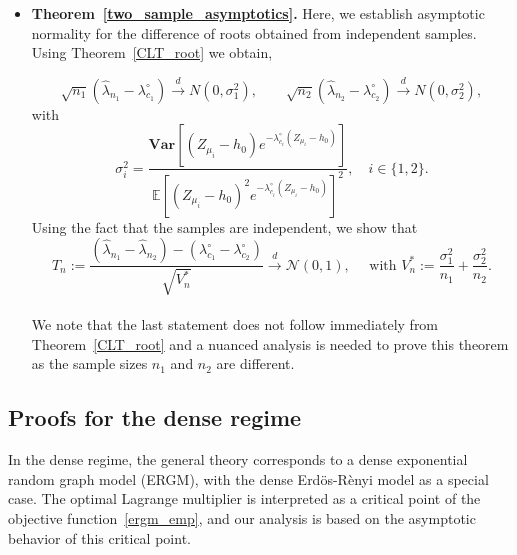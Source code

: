 \documentclass[12pt]{article}
\def\er{ Erd{\"o}s-R{\`e}nyi }
\numberwithin{equation}{section}
\begin{document}
\begin{itemize}
Then the consistency of \(\hat{\lambda}_n\) ensures that
the denominator in the RHS of \eqref{Z_Taylor_short} converges in probability: \[\dot{\Psi}_n(\lambda^{\circ}) + \frac{1}{2} (\hat{\lambda}_n - \lambda^{\circ}) \ddot{\Psi}_n(\tilde{\lambda}_n)\xrightarrow{P}\mathbb{E}\left[-(Z_{\mu}-h_0)^2e^{-\lambda^{\circ}(Z_{\mu}-h_0)}\right].\]
Next using Lemma \ref{CLT_1}, we show that 
\[\sqrt{n} (\Psi_n(\lambda^{\circ}) - \mathbb{E}[\Psi_n(\lambda^{\circ})])\xrightarrow{d}\mathcal{N}\left(0,\mathbf{Var}\left[(Z_{\mu}-h_0)e^{-\lambda(Z_{\mu}-h_0)}\right]\right).\]
Finally using Slutsky's theorem, we get
\[
\sqrt{n}(\hat{\lambda}_n - \lambda^{\circ}) \xrightarrow{d} \mathcal{N}\left(0, \frac{\mathbf{Var}\left[(Z_{\mu}-h_0)e^{-\lambda^{\circ}(Z_{\mu}-h_0)}\right]}{\mathbb{E}\left[(Z_{\mu}-h_0)^2e^{-\lambda^{\circ}(Z_{\mu}-h_0)}\right]^2}\right).
\]\\

    \item \textbf{Theorem~\ref{two_sample_asymptotics}.} Here, we establish asymptotic normality for the difference of roots obtained from independent samples. Using Theorem~\ref{CLT_root} we obtain,
   
\[
\sqrt{n_1}(\hat{\lambda}_{n_1} - \lambda^{\circ}_{c_1}) \xrightarrow{d} N(0, \sigma_1^2), 
\qquad 
\sqrt{n_2}(\hat{\lambda}_{n_2} - \lambda^{\circ}_{c_2}) \xrightarrow{d} N(0, \sigma_2^2),
\]
with $$\sigma^2_i=\frac{\mathbf{Var}\left[(Z_{\mu_i}-h_0)e^{-\lambda_{c_i}^{\circ}(Z_{\mu_i}-h_0)}\right]}{\mathbb{E}\left[(Z_{\mu_i}-h_0)^2e^{-\lambda_{c_i}^{\circ}(Z_{\mu_i}-h_0)}\right]^2}, \quad i\in\{1,2\}.$$
Using the fact that the samples are independent, we show that 
\[
T_n := \frac{(\hat{\lambda}_{n_1} - \hat{\lambda}_{n_2})-(\lambda^{\circ}_{c_1}-\lambda^{\circ}_{c_2})}{\sqrt{V_n^\ast}}\xrightarrow{d}\mathcal{N}(0,1),
\quad \text{ with }
V_n^\ast := \frac{\sigma_1^2}{n_1} + \frac{\sigma_2^2}{n_2}.
\]\\
We note that the last statement does not follow immediately from  Theorem~\ref{CLT_root} and a nuanced analysis is needed to prove this theorem as the sample sizes $n_1$ and $n_2$ are different. 
\end{itemize}

\subsection{Proofs for the dense regime}

In the dense regime, the general theory corresponds to a dense exponential random graph model (ERGM), with the dense \er model as a special case. The
optimal Lagrange multiplier is interpreted as a critical point of the objective
function~\eqref{ergm_emp}, and our analysis is based on the asymptotic behavior of this critical
point. 
\end{document}
